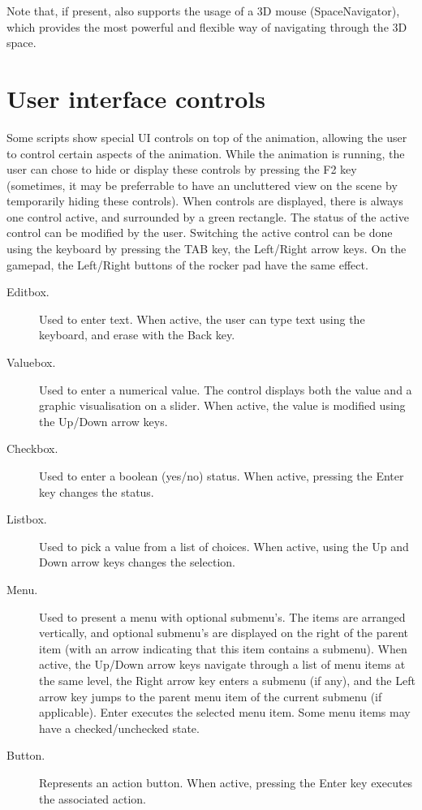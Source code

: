 Note that, if present, \softwarename also supports the usage of a 3D mouse (SpaceNavigator), which provides the most powerful and flexible way of navigating through the 3D space.

\section{User interface controls}
Some scripts show special UI controls on top of the animation, allowing the user to control certain aspects of the animation. While the animation is running, the user can chose to hide or display these controls by pressing the F2 key (sometimes, it may be preferrable to have an uncluttered view on the scene by temporarily hiding these controls). When controls are displayed, there is always one control active, and surrounded by a green rectangle. The status of the active control can be modified by the user. Switching the active control can be done using the keyboard by pressing the TAB key, the Left/Right arrow keys. On the gamepad, the Left/Right buttons of the rocker pad have the same effect.

\begin{description}
\item[Editbox.] Used to enter text. When active, the user can type text using the keyboard, and erase with the Back key. 
\item[Valuebox.] Used to enter a numerical value. The control displays both the value and a graphic visualisation on a slider. When active, the value is modified using the Up/Down arrow keys.
\item[Checkbox.] Used to enter a boolean (yes/no) status. When active, pressing the Enter key changes the status.
\item[Listbox.] Used to pick a value from a list of choices. When active, using the Up and Down arrow keys changes the selection.
\item[Menu.] Used to present a menu with optional submenu's. The items are arranged vertically, and optional submenu's are displayed on the right of the parent item (with an arrow indicating that this item contains a submenu). When active, the Up/Down arrow keys navigate through a list of menu items at the same level, the Right arrow key enters a submenu (if any), and the Left arrow key jumps to the parent menu item of the current submenu (if applicable). Enter executes the selected menu item. Some menu items may have a checked/unchecked state.
\item[Button.] Represents an action button. When active, pressing the Enter key executes the associated action.
\end{description}

